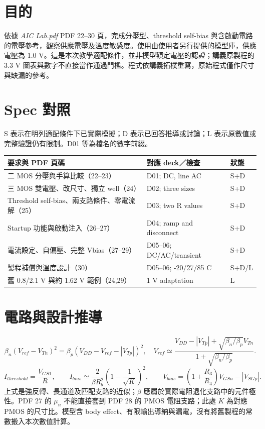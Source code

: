 \section{目的}
依據 \textit{AIC Lab.pdf} PDF 22--30 頁，完成分壓型、threshold self-bias 與含啟動電路的電壓參考，觀察供應電壓及溫度敏感度。使用由使用者另行提供的模型庫，供應電壓為 1.0 V。這是本次教學適配條件，並非模型額定電壓的認證；講義原製程的 3.3 V 圖表與數字不直接當作通過門檻。程式依講義拓樸重寫，原始程式僅作尺寸與缺漏的參考。

\section{Spec 對照}
S 表示在明列適配條件下已實際模擬；D 表示已回答推導或討論；L 表示原數值或完整驗證仍有限制。D01 等為檔名的數字前綴。
\small\begin{longtable}{p{.46\linewidth}p{.30\linewidth}p{.15\linewidth}}\toprule
要求與 PDF 頁碼 & 對應 deck／檢查 & 狀態 \\ \midrule\endhead
二 MOS 分壓與手算比較（22--23） & D01; DC, line AC & S+D \\
三 MOS 雙電壓、改尺寸、獨立 well（24） & D02; three sizes & S+D \\
Threshold self-bias、兩支路條件、零電流解（25） & D03; two R values & S+D \\
Startup 功能與啟動注入（26--27） & D04; ramp and disconnect & S+D \\
電流設定、自偏壓、完整 Vbias（27--29） & D05--06; DC/AC/transient & S+D \\
製程補償與溫度設計（30） & D05--06; -20/27/85 C & S+D/L \\
舊 0.8/2.1 V 與約 1.62 V 範例（24,29） & 1 V adaptation & L \\
\bottomrule\end{longtable}\normalsize


\section{電路與設計推導}
\[
\beta_n(V_{ref}-V_{Tn})^2=\beta_p(V_{DD}-V_{ref}-|V_{Tp}|)^2,
\quad
V_{ref}\simeq\frac{V_{DD}-|V_{Tp}|+\sqrt{\beta_n/\beta_p}V_{Tn}}{1+\sqrt{\beta_n/\beta_p}}.
\]
\[
I_{threshold}=\frac{V_{GS1}}{R},\qquad
I_{bias}\simeq\frac{2}{\beta R_b^2}\left(1-\frac{1}{\sqrt K}\right)^2,
\qquad V_{bias}=\left(1+\frac{R_3}{R_4}\right)V_{GSn}-|V_{SGp}|.
\]上式是強反轉、長通道及匹配支路的近似；$\beta$ 應屬於實際電阻退化支路中的元件極性。PDF 27 的 $\mu_n$ 不能直接套到 PDF 28 的 PMOS 電阻支路；此處 $K$ 為對應 PMOS 的尺寸比。模型含 body effect、有限輸出導納與漏電，沒有將舊製程的常數搬入本次數值計算。

